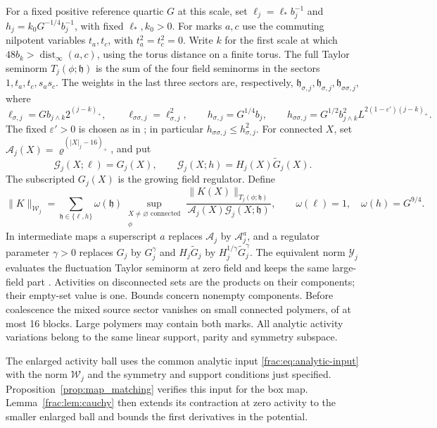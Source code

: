 \documentclass[11pt]{article}
\begin{document}
For a fixed positive reference quartic \(G\) at this scale, set
\(\ell_j=\ell_*b_j^{-1}\) and \(h_j=k_0G^{-1/4}b_j^{-1}\), with
fixed \(\ell_*,k_0>0\). For marks \(a,c\) use the commuting
nilpotent variables \(t_a,t_c\), with \(t_a^2=t_c^2=0\).
Write \(k\) for the first scale at which
\(48b_k>\operatorname{dist}_\infty(a,c)\), using the torus distance
on a finite torus. The full Taylor seminorm \(T_j(\phi;\mathfrak h)\)
is the sum of the four field seminorms in the sectors
\(1,t_a,t_c,s_as_c\). The weights in the last three sectors are,
respectively,
\(\mathfrak h_{\sigma,j},\mathfrak h_{\sigma,j},\mathfrak h_{\sigma\sigma,j}\),
where
\[
 \ell_{\sigma,j}=G b_{j\wedge k}2^{(j-k)_+},\qquad
 \ell_{\sigma\sigma,j}=\ell_{\sigma,j}^2,
 \qquad h_{\sigma,j}=G^{1/4}b_j,\qquad
 h_{\sigma\sigma,j}=G^{1/2}b_{j\wedge k}^2L^{2(1-\varepsilon')(j-k)_+}.
\]
The fixed \(\varepsilon'>0\) is chosen as in \cite[(2.20)]{ParkMap};
in particular \(h_{\sigma\sigma,j}\le h_{\sigma,j}^2\).
For connected \(X\), set
\(\mathcal A_j(X)=\varrho^{(|X|_j-16)_+}\), and put
\[
 \mathcal G_j(X;\ell)=G_j(X),\qquad
 \mathcal G_j(X;h)=H_j(X)\widetilde G_j(X).
\]
The subscripted \(G_j(X)\) is the growing field regulator.
Define
\[
 \|K\|_{\mathcal W_j}
 =\sum_{\mathfrak h\in\{\ell,h\}}\omega(\mathfrak h)
  \sup_{\substack{X\ne\varnothing\text{ connected}\\\phi}}
  \frac{\|K(X)\|_{T_j(\phi;\mathfrak h)}}
       {\mathcal A_j(X)\mathcal G_j(X;\mathfrak h)},
 \qquad \omega(\ell)=1,\quad\omega(h)=G^{9/4}.
\]
In intermediate maps a superscript \(a\) replaces
\(\mathcal A_j\) by \(\mathcal A_j^a\), and a regulator parameter
\(\gamma>0\) replaces \(G_j\) by \(G_j^\gamma\) and
\(H_j\widetilde G_j\) by \(H_j^{1/\gamma}\widetilde G_j^\gamma\).
The equivalent norm \(\mathcal Y_j\) evaluates the fluctuation
Taylor seminorm at zero field and keeps the same large-field
part \cite[Lemma 2.2]{ParkMap}. Activities on
disconnected sets are the products on their components; their
empty-set value is one. Bounds concern nonempty components.
Before coalescence the mixed source sector vanishes on
small connected polymers, of at most 16 blocks. Large
polymers may contain both marks. All analytic activity variations
belong to the same linear support, parity and symmetry subspace.


The enlarged activity ball uses the common analytic input
\eqref{frac:eq:analytic-input} with the norm \(\mathcal W_j\) and
the symmetry and support conditions just specified. Proposition~\ref{prop:map_matching}
verifies this input for the box map. Lemma~\ref{frac:lem:cauchy} then
extends its contraction at zero activity to the smaller enlarged
ball and bounds the first derivatives in the potential.
\end{document}
